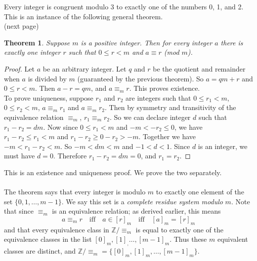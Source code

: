 \documentclass{report}
\newtheorem*{theorem}{Theorem}
\theoremstyle{definition}
\begin{document}
Every integer is congruent modulo 3 to exactly one of the numbers 0, 1, and 2. This is an instance of the following general theorem.\\
(next page)
\newpage
\begin{theorem}
Suppose $m$ is a positive integer. Then for every integer $a$ there is exactly one integer $r$ such that $0\leq r<m$ and $a\equiv r$ (mod $m$).
\end{theorem}
\begin{proof}
Let $a$ be an arbitrary integer. Let $q$ and $r$ be the quotient and remainder when $a$ is divided by $m$ (guaranteed by the previous theorem). So $a=qm+r$ and $0\leq r<m$. 
Then $a-r=qm$, and $a\equiv_m r$. This proves existence.\\
\indent To prove uniqueness, suppose $r_1$ and $r_2$ are integers such that $0\leq r_1<m$, $0\leq r_2<m$, $a\equiv_mr_1$ and $a\equiv_mr_2$. Then by symmetry
and transitivity of the equivalence relation $\equiv_m$, $r_1\equiv_mr_2$. So we can declare integer $d$ such that $r_1-r_2=dm$.
Now since $0\leq r_1<m$ and $-m<-r_2\leq0$, we have $r_1-r_2\leq r_1<m$ and $r_1-r_2\geq0-r_2>-m$. Together we have $-m<r_1-r_2<m$. So
$-m<dm<m$ and $-1<d<1$. Since $d$ is an integer, we must have $d=0$. Therefore $r_1-r_2=dm=0$, and $r_1=r_2$.
\end{proof}
\noindent This is an existence and uniqueness proof. We prove the two separately.\\
\vspace{1mm}\\
The theorem says that every integer is modulo $m$ to exactly one element of the set $\{0,1,\ldots,m-1\}$. We say this set is a \textit{complete residue system modulo} $m$. 
Note that since $\equiv_m$ is an equivalence relation; as derived earlier, this means
\begin{equation*}
a\equiv_m r\quad\text{iff}\quad a\in[r]_m\quad\text{iff}\quad[a]_m=[r]_m
\end{equation*}
and that every equivalence class in $\mathbb Z/\equiv_m$ is equal to exactly one of the equivalence classes in the list $[0]_m,[1]_,\ldots,[m-1]_m$. Thus these $m$ equivalent classes are
distinct, and $\mathbb Z/\equiv_m=\{[0]_m,[1]_m,\ldots,[m-1]_m\}$.
\newpage
\end{document}
